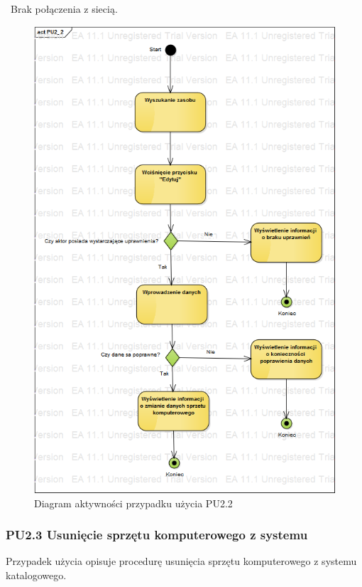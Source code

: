 \
Brak połączenia z siecią.

\begin{figure}[h!]
	\centering
	\includegraphics[scale=0.6]{img/diagrams/activityDiagrams/PU2_2}
	\caption{Diagram aktywności przypadku użycia PU2.2 \label{fig:labelADPU2.2}}
\end{figure}


\subsubsection{PU2.3 Usunięcie sprzętu komputerowego z systemu}

Przypadek użycia opisuje procedurę usunięcia sprzętu komputerowego z systemu katalogowego.


